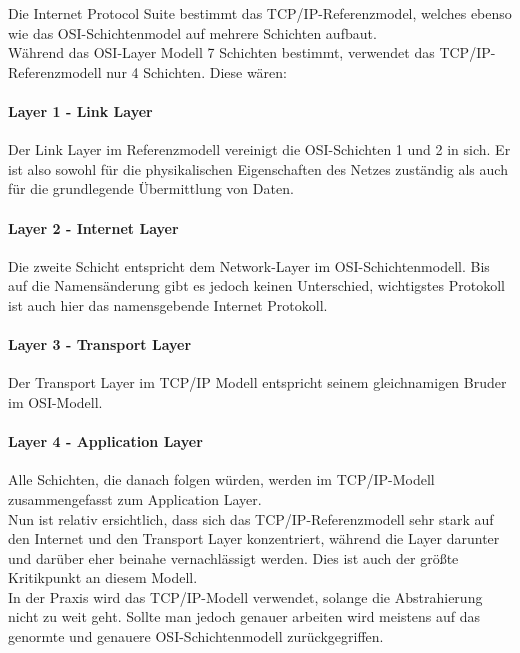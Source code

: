 \documentclass[12pt,a4paper]{report}
\begin{document}
Die Internet Protocol Suite bestimmt das TCP/IP-Referenzmodel, welches ebenso wie das OSI-Schichtenmodel auf mehrere Schichten aufbaut.\\
Während das OSI-Layer Modell 7 Schichten bestimmt, verwendet das TCP/IP-Referenzmodell nur 4 Schichten. Diese wären:\\

\paragraph{Layer 1 - Link Layer}
Der Link Layer im Referenzmodell vereinigt die OSI-Schichten 1 und 2 in sich. Er ist also sowohl für die physikalischen Eigenschaften des Netzes zuständig als auch für die grundlegende Übermittlung von Daten.

\paragraph{Layer 2 - Internet Layer}
Die zweite Schicht entspricht dem Network-Layer im OSI-Schichtenmodell. Bis auf die Namensänderung gibt es jedoch keinen Unterschied, wichtigstes Protokoll ist auch hier das namensgebende Internet Protokoll.

\paragraph{Layer 3 - Transport Layer}
Der Transport Layer im TCP/IP Modell entspricht seinem gleichnamigen Bruder im OSI-Modell. 

\paragraph{Layer 4 - Application Layer}
Alle Schichten, die danach folgen würden, werden im TCP/IP-Modell zusammengefasst zum Application Layer.\\

Nun ist relativ ersichtlich, dass sich das TCP/IP-Referenzmodell sehr stark auf den Internet und den Transport Layer konzentriert, während die Layer darunter und darüber eher beinahe vernachlässigt werden. Dies ist auch der größte Kritikpunkt an diesem Modell.\\
In der Praxis wird das TCP/IP-Modell verwendet, solange die Abstrahierung nicht zu weit geht. Sollte man jedoch genauer arbeiten wird meistens auf das genormte und genauere OSI-Schichtenmodell zurückgegriffen.\\
\end{document}
